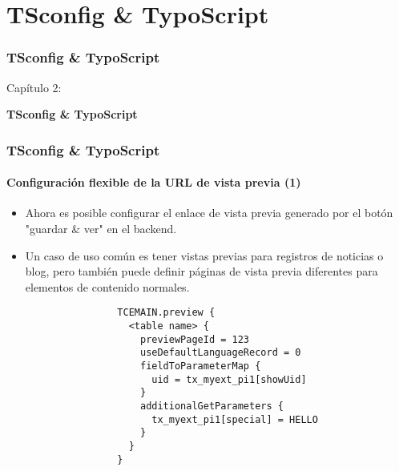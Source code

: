 %

\section{TSconfig \& TypoScript}
\begin{frame}[fragile]
	\frametitle{TSconfig \& TypoScript}

	\begin{center}\huge{Capítulo 2:}\end{center}
	\begin{center}\huge{\color{typo3darkgrey}\textbf{TSconfig \& TypoScript}}\end{center}

\end{frame}

\begin{frame}[fragile]
	\frametitle{TSconfig \& TypoScript}
	\framesubtitle{Configuración flexible de la URL de vista previa (1)}

	\lstset{basicstyle=\tiny\ttfamily}

	\begin{itemize}

		\item Ahora es posible configurar el enlace de vista previa generado por el botón
			"guardar \& ver" en el backend.

		\item Un caso de uso común es tener vistas previas para registros de noticias o blog,
			pero también puede definir páginas de vista previa diferentes para elementos
			de contenido normales.

			\begin{lstlisting}
				TCEMAIN.preview {
				  <table name> {
				    previewPageId = 123
				    useDefaultLanguageRecord = 0
				    fieldToParameterMap {
				      uid = tx_myext_pi1[showUid]
				    }
				    additionalGetParameters {
				      tx_myext_pi1[special] = HELLO
				    }
				  }
				}
			\end{lstlisting}

	\end{itemize}

\end{frame}

